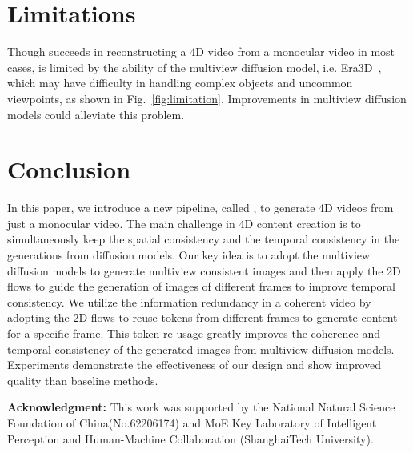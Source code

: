 \vspace{-2mm}
\section{Limitations}
Though \methodname succeeds in reconstructing a 4D video from a monocular video in most cases, \methodname is limited by the ability of the multiview diffusion model, i.e. Era3D~\citep{li2024era3d}, which may have difficulty in handling complex objects and uncommon viewpoints, as shown in Fig.~\ref{fig:limitation}. Improvements in multiview diffusion models could alleviate this problem.


\section{Conclusion}

In this paper, we introduce a new pipeline, called \methodname, to generate 4D videos from just a monocular video. The main challenge in 4D content creation is to simultaneously keep the spatial consistency and the temporal consistency in the generations from diffusion models. Our key idea is to adopt the multiview diffusion models to generate multiview consistent images and then apply the 2D flows to guide the generation of images of different frames to improve temporal consistency. We utilize the information redundancy in a coherent video by adopting the 2D flows to reuse tokens from different frames to generate content for a specific frame. This token re-usage greatly improves the coherence and temporal consistency of the generated images from multiview diffusion models. Experiments demonstrate the effectiveness of our design and show improved quality than baseline methods.


\textbf{Acknowledgment: }This work was supported by the National Natural Science Foundation of China(No.62206174) and MoE Key Laboratory of Intelligent Perception and Human-Machine Collaboration (ShanghaiTech University).